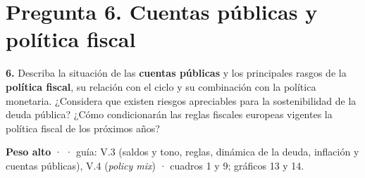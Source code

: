 \clearpage
\section*{Pregunta 6. Cuentas públicas y política fiscal}

\begin{enunciado}
\textbf{6.} Describa la situación de las \textbf{cuentas públicas} y los principales rasgos de la \textbf{política fiscal}, su relación con el ciclo y su combinación con la política monetaria. ¿Considera que existen riesgos apreciables para la sostenibilidad de la deuda pública? ¿Cómo condicionarán las reglas fiscales europeas vigentes la política fiscal de los próximos años?

\smallskip
\textbf{Peso alto} ·  · guía: V.3 (saldos y tono, reglas, dinámica de la deuda, inflación y cuentas públicas), V.4 (\emph{policy mix}) · cuadros 1 y 9; gráficos 13 y 14.
\end{enunciado}

